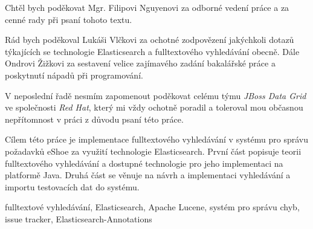 \documentclass[11pt,oneside]{fithesis2}
\begin{document}
\FrontMatter
\ThesisTitlePage

\begin{ThesisDeclaration}
  \DeclarationText
  \AdvisorName
\end{ThesisDeclaration}

\begin{ThesisThanks}
Chtěl bych poděkovat Mgr. Filipovi Nguyenovi za odborné vedení práce a za cenné rady při psaní tohoto textu. 

Rád bych poděkoval Lukáši Vlčkovi za ochotné zodpovězení jakýchkoli dotazů týkajících se technologie Elasticsearch a fulltextového vyhledávání obecně. Dále Ondrovi Žižkovi za sestavení velice zajímavého zadání bakalářské práce a poskytnutí nápadů při programování.

V neposlední řadě nesmím zapomenout poděkovat celému týmu \emph{JBoss Data Grid} ve společnosti \emph{Red Hat}, který mi vždy ochotně poradil a toleroval mou občasnou nepřítomnost v práci z důvodu psaní této práce.
\end{ThesisThanks}

\begin{ThesisAbstract}
Cílem této práce je implementace fulltextového vyhledávání v systému pro správu požadavků eShoe za využití technologie Elasticsearch. První část popisuje teorii fulltextového vyhledávání a dostupné technologie pro jeho implementaci na platformě Java. Druhá část se věnuje na návrh a implementaci vyhledávání a importu testovacích dat do systému.
\end{ThesisAbstract}

\begin{ThesisKeyWords}
fulltextové vyhledávání, Elasticsearch, Apache Lucene, systém pro správu chyb, issue tracker, Elasticsearch-Annotations
\end{ThesisKeyWords}

\MainMatter

\tableofcontents


\end{document}
